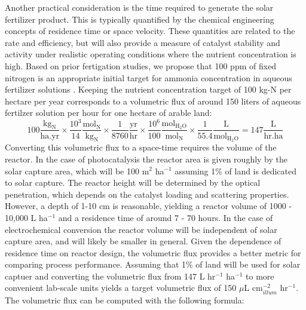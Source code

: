 
Another practical consideration is the time required to generate the solar fertilizer product. This is typically quantified by the chemical engineering concepts of residence time or space velocity. These quantities are related to the rate and efficiency, but will also provide a measure of catalyst stability and activity under realistic operating conditions where the nutrient concentration is high. Based on prior fertigation studies, we propose that 100 ppm of fixed nitrogen is an appropriate initial target for ammonia concentration in aqueous fertilizer solutions \cite{phocaides2007handbook}. Keeping the nutrient concentration target of 100 kg-N per hectare per year corresponds to a volumetric flux of around 150 liters of aqueous fertilzer solution per hour for one hectare of arable land:
\begin{equation}
\mathrm{
100 \frac{kg_N}{ha . yr} \times \frac{10^3}{14} \frac{mol_{N}}{kg_N} \times \frac{1}{8760} \frac{yr}{hr} \times \frac{10^6}{100} \frac{mol_{H_2O}}{mol_{N}} \times \frac{1}{55.4} \frac{L}{mol_{H_2O}} = 147 \frac{L}{hr . ha} 
}
\end{equation}
Converting this volumetric flux to a space-time requires the volume of the reactor. In the case of photocatalysis the reactor area is given roughly by the solar capture area, which will be 100 m$^2$ ha$^{-1}$ assuming 1\% of land is dedicated to solar capture. The reactor height will be determined by the optical penetration, which depends on the catalyst loading and scattering properties. However, a depth of 1-10 cm is reasonable, yielding a reactor volume of 1000 - 10,000 L ha$^{-1}$ and a residence time of around 7 - 70 hours. In the case of electrochemical conversion the reactor volume will be independent of solar capture area, and will likely be smaller in general. Given the dependence of residence time on reactor design, the volumetric flux provides a better metric for comparing process performance. Assuming that 1\% of land will be used for solar captuer and converting the volumetric flux from 147 L hr$^{-1}$ ha$^{-1}$ to more convenient lab-scale units yields a target volumetric flux of 150 $\mu$L cm$^{-2}_{illum}$ hr$^{-1}$. The volumetric flux can be computed with the following formula:

